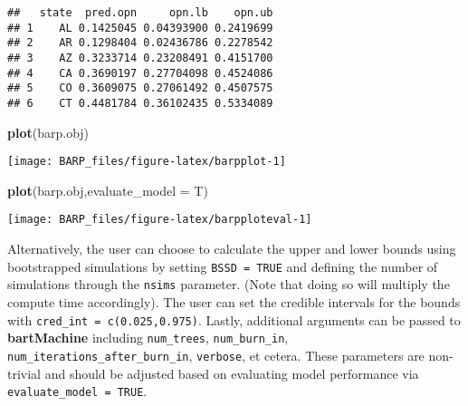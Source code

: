 \documentclass[]{article}
\newenvironment{Shaded}{\begin{snugshade}}{\end{snugshade}}
\newcommand{\KeywordTok}[1]{\textcolor[rgb]{0.13,0.29,0.53}{\textbf{#1}}}
\newcommand{\DataTypeTok}[1]{\textcolor[rgb]{0.13,0.29,0.53}{#1}}
\newcommand{\StringTok}[1]{\textcolor[rgb]{0.31,0.60,0.02}{#1}}
\newcommand{\OperatorTok}[1]{\textcolor[rgb]{0.81,0.36,0.00}{\textbf{#1}}}
\newcommand{\NormalTok}[1]{#1}
\begin{document}
\begin{Shaded}
\end{Shaded}

\begin{verbatim}
##   state  pred.opn     opn.lb    opn.ub
## 1    AL 0.1425045 0.04393900 0.2419699
## 2    AR 0.1298404 0.02436786 0.2278542
## 3    AZ 0.3233714 0.23208491 0.4151700
## 4    CA 0.3690197 0.27704098 0.4524086
## 5    CO 0.3609075 0.27061492 0.4507575
## 6    CT 0.4481784 0.36102435 0.5334089
\end{verbatim}

\begin{Shaded}
\begin{Highlighting}[]
\KeywordTok{plot}\NormalTok{(barp.obj)}
\end{Highlighting}
\end{Shaded}

\begin{center}\texttt{[image: BARP\_files/figure-latex/barpplot-1]} \end{center}

\begin{Shaded}
\begin{Highlighting}[]
\KeywordTok{plot}\NormalTok{(barp.obj,}\DataTypeTok{evaluate_model =}\NormalTok{ T)}
\end{Highlighting}
\end{Shaded}

\begin{center}\texttt{[image: BARP\_files/figure-latex/barpploteval-1]} \end{center}

Alternatively, the user can choose to calculate the upper and lower
bounds using bootstrapped simulations by setting \texttt{BSSD\ =\ TRUE}
and defining the number of simulations through the \texttt{nsims}
parameter. (Note that doing so will multiply the compute time
accordingly). The user can set the credible intervals for the bounds
with \texttt{cred\_int\ =\ c(0.025,0.975)}. Lastly, additional arguments
can be passed to \textbf{bartMachine} including \texttt{num\_trees},
\texttt{num\_burn\_in}, \texttt{num\_iterations\_after\_burn\_in},
\texttt{verbose}, et cetera. These parameters are non-trivial and should
be adjusted based on evaluating model performance via
\texttt{evaluate\_model\ =\ TRUE}.
\end{document}
